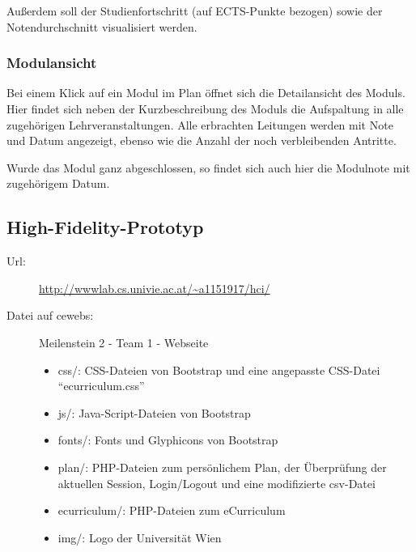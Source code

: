 \documentclass[a4paper,10pt]{scrartcl}
\begin{document}
Außerdem soll der Studienfortschritt (auf ECTS-Punkte bezogen) sowie der Notendurchschnitt visualisiert werden. 

\subsubsection{Modulansicht}

\noindent{}
\medskip

Bei einem Klick auf ein Modul im Plan öffnet sich die Detailansicht des Moduls. Hier findet sich neben der Kurzbeschreibung des Moduls die Aufspaltung in alle zugehörigen Lehrveranstaltungen. Alle erbrachten Leitungen werden mit Note und Datum angezeigt, ebenso wie die Anzahl der noch verbleibenden Antritte.

Wurde das Modul ganz abgeschlossen, so findet sich auch hier die Modulnote mit zugehörigem Datum.

\newpage
\subsection{High-Fidelity-Prototyp}

\begin{description}
 \item[Url:] \url{http://wwwlab.cs.univie.ac.at/~a1151917/hci/}
 \item[Datei auf cewebs:]Meilenstein 2 - Team 1 - Webseite
  \begin{itemize}
  \item css/: CSS-Dateien von Bootstrap und eine angepasste CSS-Datei ``ecurriculum.css''
  \item js/: Java-Script-Dateien von Bootstrap
  \item fonts/: Fonts und Glyphicons von Bootstrap
  \item plan/: PHP-Dateien zum persönlichem Plan, der Überprüfung der aktuellen Session, Login/Logout und eine modifizierte csv-Datei
  \item ecurriculum/: PHP-Dateien zum eCurriculum
  \item img/: Logo der Universität Wien
 \end{itemize}
\end{description}
\end{document}
